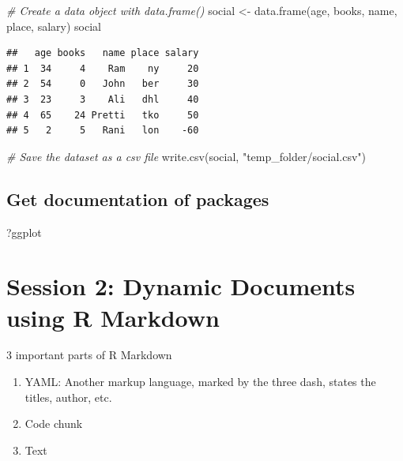 \documentclass[
]{article}
\newenvironment{Shaded}{\begin{snugshade}}{\end{snugshade}}
\newcommand{\CommentTok}[1]{\textcolor[rgb]{0.56,0.35,0.01}{\textit{#1}}}
\newcommand{\FunctionTok}[1]{\textcolor[rgb]{0.00,0.00,0.00}{#1}}
\newcommand{\NormalTok}[1]{#1}
\newcommand{\OtherTok}[1]{\textcolor[rgb]{0.56,0.35,0.01}{#1}}
\newcommand{\StringTok}[1]{\textcolor[rgb]{0.31,0.60,0.02}{#1}}
\begin{document}
\begin{Shaded}
\begin{Highlighting}[]
\CommentTok{\# Create a data object with data.frame()}
\NormalTok{social }\OtherTok{\textless{}{-}} \FunctionTok{data.frame}\NormalTok{(age, books, name, place, salary)}
\NormalTok{social}
\end{Highlighting}
\end{Shaded}

\begin{verbatim}
##   age books   name place salary
## 1  34     4    Ram    ny     20
## 2  54     0   John   ber     30
## 3  23     3    Ali   dhl     40
## 4  65    24 Pretti   tko     50
## 5   2     5   Rani   lon    -60
\end{verbatim}

\begin{Shaded}
\begin{Highlighting}[]
\CommentTok{\# Save the dataset as a csv file}
\FunctionTok{write.csv}\NormalTok{(social, }\StringTok{"temp\_folder/social.csv"}\NormalTok{)}
\end{Highlighting}
\end{Shaded}

\hypertarget{get-documentation-of-packages}{%
\subsection{Get documentation of
packages}\label{get-documentation-of-packages}}

\begin{Shaded}
\begin{Highlighting}[]
\NormalTok{?ggplot}
\end{Highlighting}
\end{Shaded}

\hypertarget{session-2-dynamic-documents-using-r-markdown}{%
\section{Session 2: Dynamic Documents using R
Markdown}\label{session-2-dynamic-documents-using-r-markdown}}

3 important parts of R Markdown

\begin{enumerate}
\def\labelenumi{\arabic{enumi}.}
\item
  YAML: Another markup language, marked by the three dash, states the
  titles, author, etc.
\item
  Code chunk
\item
  Text
\end{enumerate}
\end{document}

